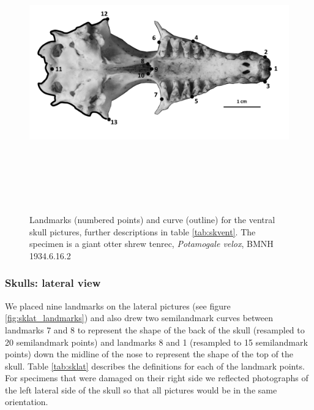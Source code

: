 \documentclass[12pt,a4paper]{article}
\begin{document}
	\begin{figure}[H] 
 	\centering
  	\includegraphics[width=12cm, height=12cm, keepaspectratio=true]
  	{figures/SkVent_BW.png}
    \caption {Landmarks (numbered points) and curve (outline) for the ventral skull pictures, further descriptions in table \ref{tab:skvent}. The specimen is a giant otter shrew tenrec, \textit{Potamogale velox}, BMNH 1934.6.16.2}
  	\label{fig:skvent_landmarks}
  	\end{figure}


	\begin{table}[h]
	\caption{Descriptions of the landmarks (points) and curves (semilandmarks) for the skulls in ventral view (see Figure \ref{fig:skvent_landmarks}.} 
	
	\label{tab:skvent}
	\end{table}
	
\subsubsection{Skulls: lateral view}
	We placed nine landmarks on the lateral pictures (see figure \ref{fig:sklat_landmarks}) and also drew two semilandmark curves between landmarks 7 and 8 to represent the shape of the back of the skull (resampled to 20 semilandmark points) and landmarks 8 and 1 (resampled to 15 semilandmark points) down the midline of the nose to represent the shape of the top of the skull. Table \ref{tab:sklat} describes the definitions for each of the landmark points. 
	For specimens that were damaged on their right side we reflected photographs of the left lateral side of the skull so that all pictures would be in the same orientation.
\end{document}
